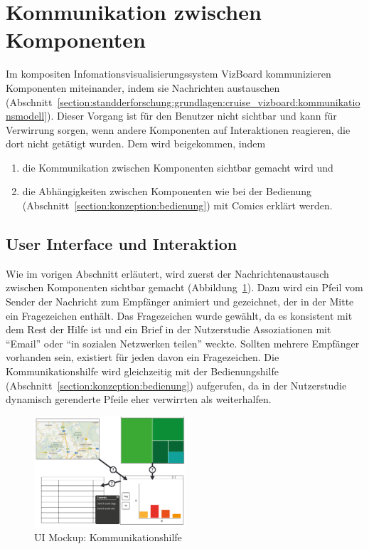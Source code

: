 \documentclass[
	headsepline,
	footsepline,
	fontsize=12pt,
	bibliography=totoc
]{scrbook}
\begin{document}
\section{Kommunikation zwischen Komponenten}
\label{section:konzeption:kommunikation}

Im kompositen Infomationsvisualisierungssystem VizBoard kommunizieren Komponenten miteinander, indem sie Nachrichten austauschen (Abschnitt~\ref{section:standderforschung:grundlagen:cruise_vizboard:kommunikationsmodell}). Dieser Vorgang ist für den Benutzer nicht sichtbar und kann für Verwirrung sorgen, wenn andere Komponenten auf Interaktionen reagieren, die dort nicht getätigt wurden. Dem wird beigekommen, indem 

\begin{enumerate}
	\item die Kommunikation zwischen Komponenten sichtbar gemacht wird und
	\item die Abhängigkeiten zwischen Komponenten wie bei der Bedienung (Abschnitt~\ref{section:konzeption:bedienung}) mit Comics erklärt werden.
\end{enumerate}

\subsection{User Interface und Interaktion}
\label{section:konzeption:kommunikation:ui}

Wie im vorigen Abschnitt erläutert, wird zuerst der Nachrichtenaustausch zwischen Komponenten sichtbar gemacht (Abbildung~\ref{figure:kommunikation-step1}). Dazu wird ein Pfeil vom Sender der Nachricht zum Empfänger animiert und gezeichnet, der in der Mitte ein Fragezeichen enthält. Das Fragezeichen wurde gewählt, da es konsistent mit dem Rest der Hilfe ist und ein Brief in der Nutzerstudie Assoziationen mit \enquote{Email} oder \enquote{in sozialen Netzwerken teilen} weckte. Sollten mehrere Empfänger vorhanden sein, existiert für jeden davon ein Fragezeichen. Die Kommunikationshilfe wird gleichzeitig mit der Bedienungshilfe (Abschnitt~\ref{section:konzeption:bedienung}) aufgerufen, da in der Nutzerstudie dynamisch gerenderte Pfeile eher verwirrten als weiterhalfen.

\begin{figure}[htbp]
   \centering
   \includegraphics[width=0.5\textwidth]{images/konzeption-kommunikation-step1.png}
   \caption{UI Mockup: Kommunikationshilfe}
   \label{figure:kommunikation-step1}
\end{figure}
\end{document}
